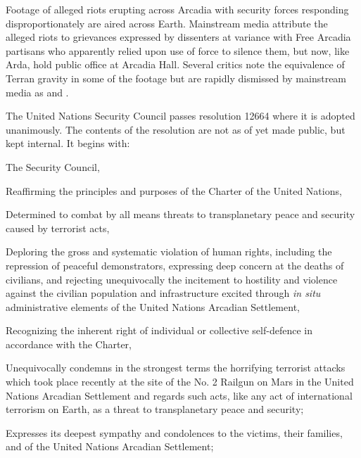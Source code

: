 

Footage of alleged riots erupting across Arcadia with security forces responding disproportionately are aired across Earth. Mainstream media attribute the alleged riots to grievances expressed by dissenters at variance with Free Arcadia partisans who apparently relied upon use of force to silence them, but now, like Arda, hold public office at Arcadia Hall. Several critics note the equivalence of Terran gravity in some of the footage but are rapidly dismissed by mainstream media as  and .
\StopTimelineDate

The United Nations Security Council passes resolution 12664 where it is adopted unanimously. The contents of the resolution are not as of yet made public, but kept internal. It begins with:

\startTimelineGeneralDocument
The Security Council,

Reaffirming the principles and purposes of the Charter of the United Nations,

Determined to combat by all means threats to transplanetary peace and security caused by terrorist acts,

Deploring the gross and systematic violation of human rights, including the repression of peaceful demonstrators, expressing deep concern at the deaths of civilians, and rejecting unequivocally the incitement to hostility and violence against the civilian population and infrastructure excited through {\it in situ} administrative elements of the United Nations Arcadian Settlement,

Recognizing the inherent right of individual or collective self-defence in accordance with the Charter,

\startitemize[n]
\setupwhitespace[big]
\item Unequivocally condemns in the strongest terms the horrifying terrorist attacks which took place recently at the site of the No. \type{#}2 Railgun on Mars in the United Nations Arcadian Settlement and regards such acts, like any act of international terrorism on Earth, as a threat to transplanetary peace and security;

\item Expresses its deepest sympathy and condolences to the victims, their families, and of the United Nations Arcadian Settlement;

